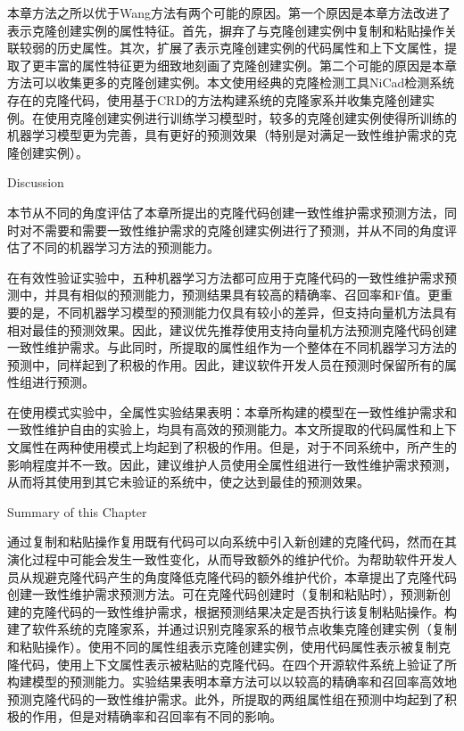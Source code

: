 本章方法之所以优于Wang方法有两个可能的原因。第一个原因是本章方法改进了表示克隆创建实例的属性特征。首先，摒弃了与克隆创建实例中复制和粘贴操作关联较弱的历史属性。其次，扩展了表示克隆创建实例的代码属性和上下文属性，提取了更丰富的属性特征更为细致地刻画了克隆创建实例。第二个可能的原因是本章方法可以收集更多的克隆创建实例。本文使用经典的克隆检测工具NiCad检测系统存在的克隆代码，使用基于CRD的方法构建系统的克隆家系并收集克隆创建实例。在使用克隆创建实例进行训练学习模型时，较多的克隆创建实例使得所训练的机器学习模型更为完善，具有更好的预测效果（特别是对满足一致性维护需求的克隆创建实例）。

{Discussion}

本节从不同的角度评估了本章所提出的克隆代码创建一致性维护需求预测方法，同时对不需要和需要一致性维护需求的克隆创建实例进行了预测，并从不同的角度评估了不同的机器学习方法的预测能力。

在有效性验证实验中，五种机器学习方法都可应用于克隆代码的一致性维护需求预测中，并具有相似的预测能力，预测结果具有较高的精确率、召回率和F值。更重要的是，不同机器学习模型的预测能力仅具有较小的差异，但支持向量机方法具有相对最佳的预测效果。因此，建议优先推荐使用支持向量机方法预测克隆代码创建一致性维护需求。与此同时，所提取的属性组作为一个整体在不同机器学习方法的预测中，同样起到了积极的作用。因此，建议软件开发人员在预测时保留所有的属性组进行预测。

在使用模式实验中，全属性实验结果表明：本章所构建的模型在一致性维护需求和一致性维护自由的实验上，均具有高效的预测能力。本文所提取的代码属性和上下文属性在两种使用模式上均起到了积极的作用。但是，对于不同系统中，所产生的影响程度并不一致。因此，建议维护人员使用全属性组进行一致性维护需求预测，从而将其使用到其它未验证的系统中，使之达到最佳的预测效果。


{Summary of this Chapter}

通过复制和粘贴操作复用既有代码可以向系统中引入新创建的克隆代码，然而在其演化过程中可能会发生一致性变化，从而导致额外的维护代价。为帮助软件开发人员从规避克隆代码产生的角度降低克隆代码的额外维护代价，本章提出了克隆代码创建一致性维护需求预测方法。可在克隆代码创建时（复制和粘贴时），预测新创建的克隆代码的一致性维护需求，根据预测结果决定是否执行该复制粘贴操作。构建了软件系统的克隆家系，并通过识别克隆家系的根节点收集克隆创建实例（复制和粘贴操作）。使用不同的属性组表示克隆创建实例，使用代码属性表示被复制克隆代码，使用上下文属性表示被粘贴的克隆代码。在四个开源软件系统上验证了所构建模型的预测能力。实验结果表明本章方法可以以较高的精确率和召回率高效地预测克隆代码的一致性维护需求。此外，所提取的两组属性组在预测中均起到了积极的作用，但是对精确率和召回率有不同的影响。

